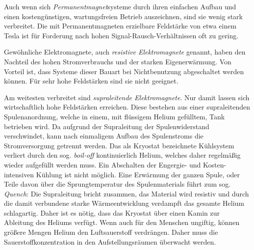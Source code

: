 Auch wenn sich \textit{Permanentmagnet}systeme durch ihren einfachen Aufbau und einen kostengünstigen, wartungsfreien Betrieb auszeichnen, sind sie wenig stark verbreitet. Die mit Permanentmagneten erzielbare Feldstärke von etwa einem Tesla ist für Forderung nach hohen Signal-Rausch-Verhältnissen oft zu gering.

Gewöhnliche Elektromagnete, auch \textit{resistive Elektromagnete} genannt, haben den Nachteil des hohen Stromverbrauchs und der starken Eigenerwärmung. Von Vorteil ist, dass Systeme dieser Bauart bei Nichtbenutzung abgeschaltet werden können. Für sehr hohe Feldstärken sind sie nicht geeignet.

Am weitesten verbreitet sind \textit{supraleitende Elektromagnete}. Nur damit lassen sich wirtschaftlich hohe Feldstärken erreichen. Diese bestehen aus einer supraleitenden Spulenanordnung, welche in einem, mit flüssigem Helium gefülltem, Tank betrieben wird. Da aufgrund der Supraleitung der Spulenwiderstand verschwindet, kann nach einmaligem Aufbau des Spulenstroms die Stromversorgung getrennt werden. Das als Kryostat bezeichnete Kühlsystem verliert durch den sog. \textit{boil-off} kontinuierlich Helium, welches daher regelmäßig wieder aufgefüllt werden muss. Ein Abschalten der Engergie- und Kosten-intensiven Kühlung ist nicht möglich. Eine Erwärmung der ganzen Spule, oder Teile davon über die Sprungtemperatur des Spulenmaterials führt zum sog. \textit{Quench}: Die Supraleitung bricht zusammen, das Material wird resistiv und durch die damit verbundene starke Wärmeentwicklung verdampft das gesamte Helium schlagartig. Daher ist es nötig, dass das Kryostat über einen Kamin zur Ableitung des Heliums verfügt. Wenn auch für den Menschen ungiftig, können größere Mengen Helium den Luftsauerstoff verdrängen. Daher muss die Sauerstoffkonzentration in den Aufstellungsräumen überwacht werden.

